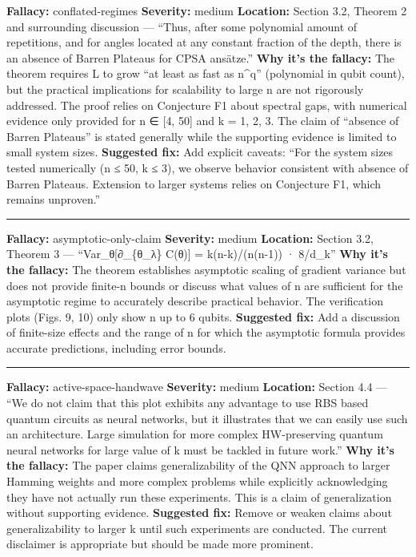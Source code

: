 \documentclass[10pt,letterpaper]{article}
\begin{document}
\textbf{Fallacy:} conflated-regimes
\textbf{Severity:} medium
\textbf{Location:} Section 3.2, Theorem 2 and surrounding discussion --- ``Thus, after some polynomial amount of repetitions, and for angles located at any constant fraction of the depth, there is an absence of Barren Plateaus for CPSA ansätze.''
\textbf{Why it's the fallacy:} The theorem requires L to grow ``at least as fast as n\^{}q'' (polynomial in qubit count), but the practical implications for scalability to large n are not rigorously addressed. The proof relies on Conjecture F1 about spectral gaps, with numerical evidence only provided for n ∈ {[}4, 50{]} and k = 1, 2, 3. The claim of ``absence of Barren Plateaus'' is stated generally while the supporting evidence is limited to small system sizes.
\textbf{Suggested fix:} Add explicit caveats: ``For the system sizes tested numerically (n ≤ 50, k ≤ 3), we observe behavior consistent with absence of Barren Plateaus. Extension to larger systems relies on Conjecture F1, which remains unproven.''

\begin{center}\rule{0.5\linewidth}{0.5pt}\end{center}

\textbf{Fallacy:} asymptotic-only-claim
\textbf{Severity:} medium
\textbf{Location:} Section 3.2, Theorem 3 --- ``Var\_θ{[}∂\_\{θ\_λ\} C(θ){]} = k(n-k)/(n(n-1)) · 8/d\_k''
\textbf{Why it's the fallacy:} The theorem establishes asymptotic scaling of gradient variance but does not provide finite-n bounds or discuss what values of n are sufficient for the asymptotic regime to accurately describe practical behavior. The verification plots (Figs. 9, 10) only show n up to 6 qubits.
\textbf{Suggested fix:} Add a discussion of finite-size effects and the range of n for which the asymptotic formula provides accurate predictions, including error bounds.

\begin{center}\rule{0.5\linewidth}{0.5pt}\end{center}

\textbf{Fallacy:} active-space-handwave
\textbf{Severity:} medium
\textbf{Location:} Section 4.4 --- ``We do not claim that this plot exhibits any advantage to use RBS based quantum circuits as neural networks, but it illustrates that we can easily use such an architecture. Large simulation for more complex HW-preserving quantum neural networks for large value of k must be tackled in future work.''
\textbf{Why it's the fallacy:} The paper claims generalizability of the QNN approach to larger Hamming weights and more complex problems while explicitly acknowledging they have not actually run these experiments. This is a claim of generalization without supporting evidence.
\textbf{Suggested fix:} Remove or weaken claims about generalizability to larger k until such experiments are conducted. The current disclaimer is appropriate but should be made more prominent.
\end{document}
